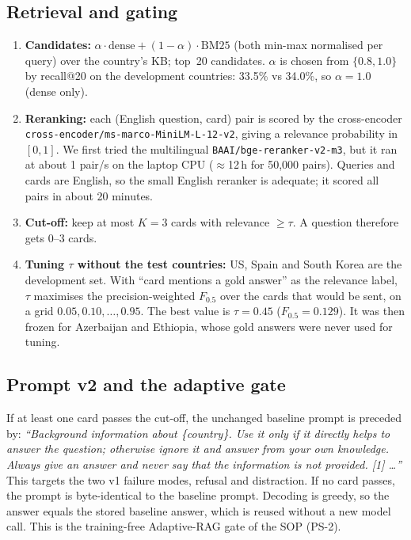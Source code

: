 \documentclass[11pt]{article}
\begin{document}
\subsection{Retrieval and gating}
\begin{enumerate}
\item \textbf{Candidates:} $\alpha\cdot\text{dense} + (1-\alpha)\cdot\text{BM25}$ (both min-max
normalised per query) over the country's KB; top~20 candidates. $\alpha$ is chosen from
$\{0.8, 1.0\}$ by recall@20 on the development countries: 33.5\% vs 34.0\%, so $\alpha{=}1.0$
(dense only).
\item \textbf{Reranking:} each (English question, card) pair is scored by the cross-encoder
\texttt{cross-encoder/ms-marco-MiniLM-L-12-v2}, giving a relevance probability in $[0,1]$. We first
tried the multilingual \texttt{BAAI/bge-reranker-v2-m3}, but it ran at about 1 pair/s on the laptop CPU
($\approx$12\,h for 50{,}000 pairs). Queries and cards are English, so the small English reranker is
adequate; it scored all pairs in about 20 minutes.
\item \textbf{Cut-off:} keep at most $K{=}3$ cards with relevance $\geq\tau$. A question therefore gets
0--3 cards.
\item \textbf{Tuning $\tau$ without the test countries:} US, Spain and South Korea are the
development set. With ``card mentions a gold answer'' as the relevance label, $\tau$ maximises the
precision-weighted $F_{0.5}$ over the cards that would be sent, on a grid $0.05, 0.10, \ldots, 0.95$.
The best value is $\tau{=}0.45$ ($F_{0.5}{=}0.129$). It was then frozen for Azerbaijan and Ethiopia,
whose gold answers were never used for tuning.
\end{enumerate}

\subsection{Prompt v2 and the adaptive gate}
If at least one card passes the cut-off, the unchanged baseline prompt is preceded by:
\emph{``Background information about \{country\}. Use it only if it directly helps to answer the
question; otherwise ignore it and answer from your own knowledge. Always give an answer and never say
that the information is not provided. [1] \ldots''} This targets the two v1 failure modes, refusal and
distraction. If no card passes, the prompt is byte-identical to the baseline prompt. Decoding is
greedy, so the answer equals the stored baseline answer, which is reused without a new model call.
This is the training-free Adaptive-RAG gate of the SOP (PS-2).
\end{document}
